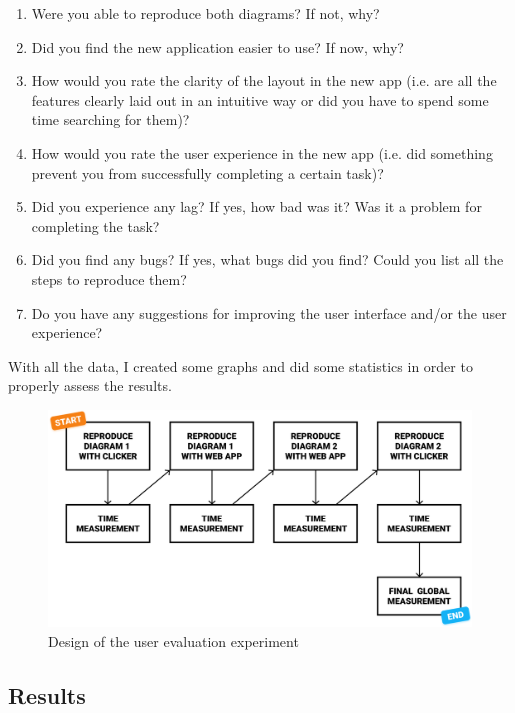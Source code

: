 \documentclass[]{usiinfbachelorproject}
\begin{document}
\begin{enumerate}
	\item Were you able to reproduce both diagrams? If not, why?
	\item Did you find the new application easier to use? If now, why?
	\item How would you rate the clarity of the layout in the new app (i.e. are all the features clearly laid out in an intuitive way or did you have to spend some time searching for them)?
	\item How would you rate the user experience in the new app (i.e. did something prevent you from successfully completing a certain task)?
	\item Did you experience any lag? If yes, how bad was it? Was it a problem for completing the task?
	\item Did you find any bugs? If yes, what bugs did you find? Could you list all the steps to reproduce them?
	\item Do you have any suggestions for improving the user interface and/or the user experience?
\end{enumerate}

\noindent With all the data, I created some graphs and did some statistics in order to properly assess the results.


\begin{figure}[h!]
\centering
\includegraphics[width=\textwidth-50pt]{figures/experiment-design.png}
\caption {Design of the user evaluation experiment}
\end{figure}

\vspace{\fill}
\pagebreak

\subsection{Results}
\end{document}
